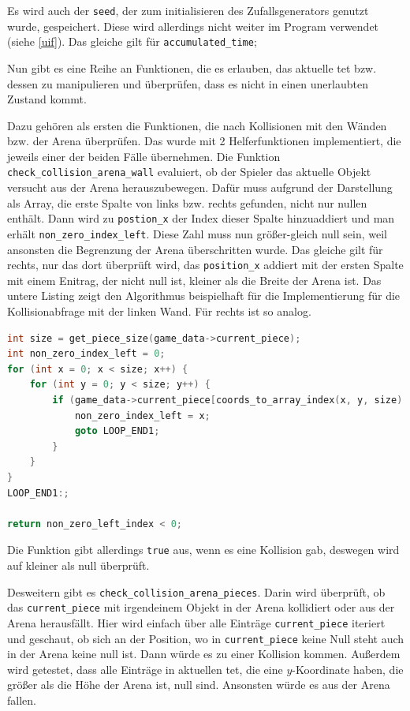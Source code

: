 \documentclass[11pt]{article}
\newcommand{\lstin}[1]{\lstinline[language=C]{#1}}
\begin{document}
Es wird auch der \lstin{seed}, der zum initialisieren des Zufallsgenerators genutzt wurde, gespeichert. Diese wird allerdings nicht weiter im Program verwendet (siehe \ref{uif}).
Das gleiche gilt für \lstin{accumulated_time};

Nun gibt es eine Reihe an Funktionen, die es erlauben, das aktuelle \gls{tet} bzw. dessen zu manipulieren und überprüfen, dass es nicht in einen unerlaubten Zustand kommt.

Dazu gehören als ersten die Funktionen, die nach Kollisionen mit den Wänden bzw. der Arena überprüfen. 
Das wurde mit 2 Helferfunktionen implementiert, die jeweils einer der beiden Fälle übernehmen.
Die Funktion \lstin{check_collision_arena_wall} evaluiert, ob der Spieler das aktuelle Objekt versucht aus der Arena herauszubewegen. 
Dafür muss aufgrund der Darstellung als Array, die erste Spalte von links bzw. rechts gefunden, nicht nur nullen enthält.
Dann wird zu \lstin{postion_x} der Index dieser Spalte hinzuaddiert und man erhält \lstin{non_zero_index_left}. Diese Zahl muss nun größer-gleich null sein, weil ansonsten die Begrenzung der Arena überschritten wurde.
Das gleiche gilt für rechts, nur das dort überprüft wird, das \lstin{position_x} addiert mit der ersten Spalte mit einem Enitrag, der nicht null ist, kleiner als die Breite der Arena ist.
Das untere Listing zeigt den Algorithmus beispielhaft für die Implementierung für die Kollisionabfrage mit der linken Wand. Für rechts ist so analog.
\begin{lstlisting}[language=C]
int size = get_piece_size(game_data->current_piece);
int non_zero_index_left = 0;
for (int x = 0; x < size; x++) {
    for (int y = 0; y < size; y++) {
        if (game_data->current_piece[coords_to_array_index(x, y, size) + 1] != 0) {
            non_zero_index_left = x;
            goto LOOP_END1;
        }
    }
}
LOOP_END1:;

return non_zero_left_index < 0; 
\end{lstlisting}

Die Funktion gibt allerdings \lstin{true} aus, wenn es eine Kollision gab, deswegen wird auf kleiner als null überprüft.

Desweitern gibt es \lstin{check_collision_arena_pieces}. Darin wird überprüft, ob das \lstin{current_piece} mit irgendeinem Objekt in der Arena kollidiert oder aus der Arena herausfällt.
Hier wird einfach über alle Einträge \lstin{current_piece} iteriert und geschaut, ob sich an der Position, wo in \lstin{current_piece} keine Null steht auch in der Arena keine null ist. 
Dann würde es zu einer Kollision kommen. Außerdem wird getestet, dass alle Einträge in aktuellen \gls{tet}, die eine $y$-Koordinate haben, die größer als die Höhe der Arena ist, null sind.
Ansonsten würde es aus der Arena fallen.
\end{document}
